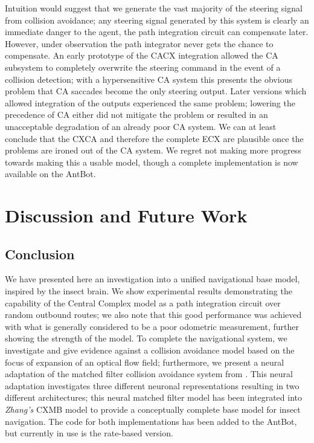 \documentclass[a4paper,11pt,twoside,openright]{article}
\let\oldsection\section
\def\section{\cleardoublepage\oldsection}
\begin{document}
Intuition would suggest that we generate the vast majority of the
steering signal from collision avoidance; any steering signal
generated by this system is clearly an immediate danger to the agent,
the path integration circuit can compensate later. However, under
observation the path integrator never gets the chance to
compensate. An early prototype of the CACX integration allowed the CA
subsystem to completely overwrite the steering command in the event of
a collision detection; with a hypersensitive CA system this presents
the obvious problem that CA saccades become the only steering output.
Later versions which allowed integration of the outputs experienced
the same problem; lowering the precedence of CA either did not
mitigate the problem or resulted in an unacceptable degradation of an
already poor CA system. We can at least conclude that the CXCA and
therefore the complete ECX are plausible once the problems are ironed
out of the CA system. We regret not making more progress towards
making this a usable model, though a complete implementation is now
available on the AntBot.
\newpage


\section{ Discussion and Future Work}
\subsection{Conclusion}
We have presented here an investigation into a unified navigational
base model, inspired by the insect brain. We show experimental results
demonstrating the capability of the Central Complex model as a path
integration circuit over random outbound routes; we also note that
this good performance was achieved with what is generally considered
to be a poor odometric measurement, further showing the strength of
the model. To complete the navigational system, we investigate and
give evidence against a collision avoidance model based on the focus
of expansion of an optical flow field; furthermore, we present a
neural adaptation of the matched filter collision avoidance system
from \cite{Mitchell2018}. This neural adaptation investigates three
different neuronal representations resulting in two different
architectures; this neural matched filter model has been integrated
into \textit{Zhang's} CXMB model to provide a conceptually complete
base model for insect navigation. The code for both implementations
has been added to the AntBot, but currently in use is the rate-based
version.\newline\par
\end{document}
